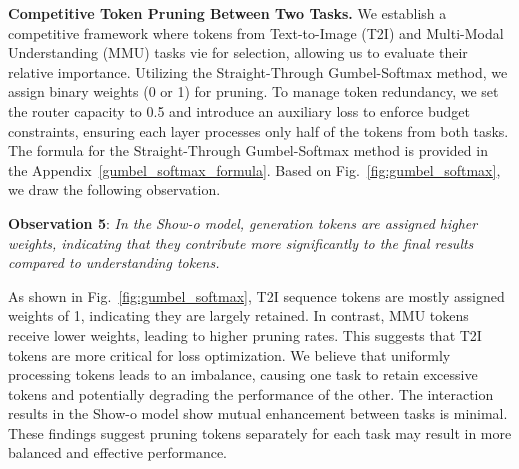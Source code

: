 
 
\textbf{Competitive Token Pruning Between Two Tasks.} We establish a competitive framework where tokens from Text-to-Image (T2I) and Multi-Modal Understanding (MMU) tasks vie for selection, allowing us to evaluate their relative importance. Utilizing the Straight-Through Gumbel-Softmax method, we assign binary weights (0 or 1) for pruning. To manage token redundancy, we set the router capacity to 0.5 and introduce an auxiliary loss to enforce budget constraints, ensuring each layer processes only half of the tokens from both tasks. The formula for the Straight-Through Gumbel-Softmax method is provided in the Appendix~\ref{gumbel_softmax_formula}. Based on Fig.~\ref{fig:gumbel_softmax}, we draw the following observation.



\textbf{Observation 5}: \textit{In the Show-o model, generation tokens are assigned higher weights, indicating that they contribute more significantly to the final results compared to understanding tokens.}

As shown in Fig.~\ref{fig:gumbel_softmax}, T2I sequence tokens are mostly assigned weights of 1, indicating they are largely retained. In contrast, MMU tokens receive lower weights, leading to higher pruning rates. This suggests that T2I tokens are more critical for loss optimization. We believe that uniformly processing tokens leads to an imbalance, causing one task to retain excessive tokens and potentially degrading the performance of the other. The interaction results in the Show-o model show mutual enhancement between tasks is minimal. These findings suggest pruning tokens separately for each task may result in more balanced and effective performance.


